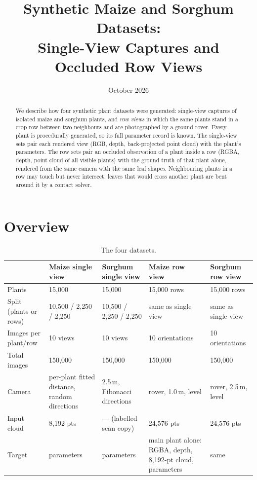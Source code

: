 \documentclass[11pt]{article}
\title{Synthetic Maize and Sorghum Datasets:\\Single-View Captures and Occluded Row Views}
\author{}
\date{October 2026}
\begin{document}
\maketitle

\begin{abstract}
We describe how four synthetic plant datasets were generated: single-view captures of isolated maize and sorghum plants,
and \emph{row views} in which the same plants stand in a crop row between two neighbours and are photographed by a ground
rover. Every plant is procedurally generated, so its full parameter record is known. The single-view sets pair each
rendered view (RGB, depth, back-projected point cloud) with the plant's parameters. The row sets pair an occluded
observation of a plant inside a row (RGBA, depth, point cloud of all visible plants) with the ground truth of that plant
alone, rendered from the same camera with the same leaf shapes. Neighbouring plants in a row may touch but never
intersect; leaves that would cross another plant are bent around it by a contact solver.
\end{abstract}

\tableofcontents

\section{Overview}

\begin{table}[H]
\centering\footnotesize
\begin{tabularx}{\linewidth}{>{\raggedright\arraybackslash}p{2.3cm}YYYY}
\toprule
 & Maize single view & Sorghum single view & Maize row view & Sorghum row view \\
\midrule
Plants & 15{,}000 & 15{,}000 & 15{,}000 rows & 15{,}000 rows \\
Split (plants or rows) & 10{,}500 / 2{,}250 / 2{,}250 & 10{,}500 / 2{,}250 / 2{,}250 & same as single view & same as single view \\
Images per plant/row & 10 views & 10 views & 10 orientations & 10 orientations \\
Total images & 150{,}000 & 150{,}000 & 150{,}000 & 150{,}000 \\
Camera & per-plant fitted distance, random directions & 2.5\,m, Fibonacci directions & rover, 1.0\,m, level & rover, 2.5\,m, level \\
Input cloud & 8{,}192 pts & --- (labelled scan copy) & 24{,}576 pts & 24{,}576 pts \\
Target & parameters & parameters & main plant alone: RGBA, depth, 8{,}192-pt cloud, parameters & same \\
\bottomrule
\end{tabularx}
\caption{The four datasets.}
\end{table}
\end{document}
